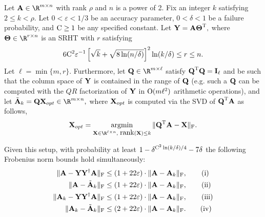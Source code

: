 \begin{theorem}
\label{thm:quality-of-approximation-guarantee}
Let $\matA \in \R^{m \times n}$ %
with rank $\rho$ and $n$ is a power of 2. Fix an integer $k$ satisfying $ 2 \leq k < \rho$. Let $0 < \varepsilon < 1/3$
be an accuracy parameter, $0 < \delta < 1$ be a failure probability, and $\mathrm{C}\ge 1$ be any specified constant.
Let
${\bm{\mathrm{Y}}} = {\bm{\mathrm{A}}} {\bm{\mathrm{\Theta}}} ^{\textsc{T}},$
where $\matTh \in \R^{r \times n}$ is an SRHT with $r$ satisfying %
\begin{equation}\label{eqn:r}
 6 \const{C}^2 \varepsilon^{-1} \left[\sqrt{k} + \sqrt{8\ln(n/\delta)} \right]^2 \ln(k/\delta) \leq r \leq n.
\end{equation}
Let $\ell = \min\{m,r\}$.
Furthermore,
let $\matQ \in \R^{m \times \ell}$ satisfy ${\bm{\mathrm{Q}}}^{\textsc{T}} {\bm{\mathrm{Q}}} = {\bm{\mathrm{I}}}_{\ell}$ and be such that the column space of ${\bm{\mathrm{Y}}}$ is contained in the range of ${\bm{\mathrm{Q}}}$
(e.g. such a ${\bm{\mathrm{Q}}}$ can be computed with the $QR$ factorization of ${\bm{\mathrm{Y}}}$ in $\mathrm{O}(m \ell^2 )$ arithmetic operations),
and let $\tilde{\matA}_k = \matQ \matX_{opt} \in \R^{m \times n},$
where ${\bm{\mathrm{X}}}_{opt} $ is computed via the SVD of $ {\bm{\mathrm{Q}}}^{\textsc{T}} {\bm{\mathrm{A}}}$ as follows,
$$\matX_{opt} = \argmin_{\matX \in \R^{\ell \times n},\,\, \rank(\matX) \le k}\FNorm{ \matQ\transp \matA - \matX }.$$

Given this setup, with probability at least $1 -  \delta^{\mathrm{C}^2 \ln(k/\delta)/4} - 7\delta$ the following Frobenius norm bounds hold simultaneously:
\begin{align}
\mbox{}\| {\bm{\mathrm{A}}} - {\bm{\mathrm{Y}}} {{\bm{\mathrm{Y}}}}^\dagger  {\ensuremath{\bm{\mathrm{A}}}} \|_\mathrm{F}   & \le \left(1 + 22 \varepsilon \right)  \cdot \mbox{}\|{\bm{\mathrm{A}}}-{\bm{\mathrm{A}}}_k\|_\mathrm{F}, \tag{i} \\
\mbox{}\|{\bm{\mathrm{A}}} - \tilde{{\bm{\mathrm{A}}}}_k\|_\mathrm{F}               &  \le \left(1 + 22 \varepsilon \right)  \cdot \mbox{}\|{\bm{\mathrm{A}}}-{\bm{\mathrm{A}}}_k\|_\mathrm{F}, \tag{ii}\\
\mbox{}\| {\bm{\mathrm{A}}}_k - {\bm{\mathrm{Y}}} {{\bm{\mathrm{Y}}}}^\dagger  {\ensuremath{\bm{\mathrm{A}}}} \|_\mathrm{F} & \le  \left(  1+ 22 \varepsilon  \right) \cdot \mbox{}\|{\bm{\mathrm{A}}}-{\bm{\mathrm{A}}}_k\|_\mathrm{F}, \tag{iii}\\
\mbox{}\| {\bm{\mathrm{A}}}_k -\tilde{{\bm{\mathrm{A}}}}_k \|_\mathrm{F}            & \le  \left(  2+ 22 \varepsilon  \right) \cdot \mbox{}\|{\bm{\mathrm{A}}}-{\bm{\mathrm{A}}}_k\|_\mathrm{F}.  \tag{iv}
\end{align}


\end{theorem}

